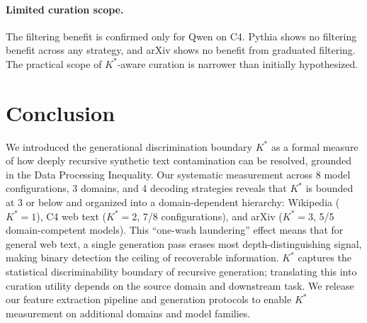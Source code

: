 \documentclass[11pt]{article}
\begin{document}
\paragraph{Limited curation scope.} The filtering benefit is confirmed only for Qwen on C4. Pythia shows no filtering benefit across any strategy, and arXiv shows no benefit from graduated filtering. The practical scope of $K^*$-aware curation is narrower than initially hypothesized.

\section{Conclusion}

We introduced the generational discrimination boundary $K^*$ as a formal measure of how deeply recursive synthetic text contamination can be resolved, grounded in the Data Processing Inequality. Our systematic measurement across 8 model configurations, 3 domains, and 4 decoding strategies reveals that $K^*$ is bounded at 3 or below and organized into a domain-dependent hierarchy: Wikipedia ($K^*{=}1$), C4 web text ($K^*{=}2$, 7/8 configurations), and arXiv ($K^*{=}3$, 5/5 domain-competent models). This ``one-wash laundering'' effect means that for general web text, a single generation pass erases most depth-distinguishing signal, making binary detection the ceiling of recoverable information. $K^*$ captures the statistical discriminability boundary of recursive generation; translating this into curation utility depends on the source domain and downstream task. We release our feature extraction pipeline and generation protocols to enable $K^*$ measurement on additional domains and model families.


\end{document}
